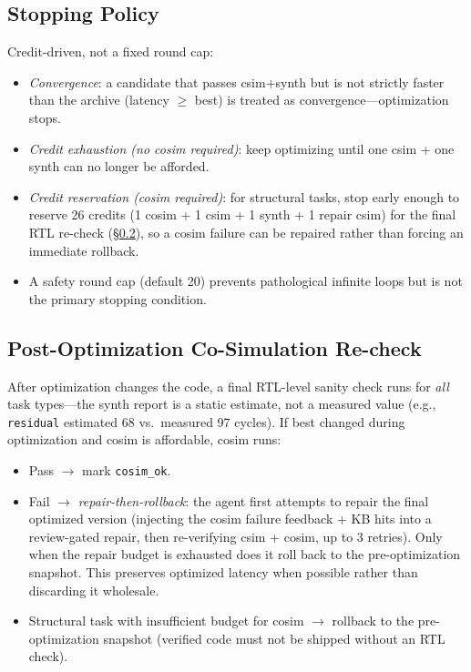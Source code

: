 \documentclass[10pt,conference,letterpaper]{IEEEtran}
\begin{document}
\subsection{Stopping Policy}

Credit-driven, not a fixed round cap:
\begin{itemize}
    \item \emph{Convergence}: a candidate that passes csim+synth but is not strictly faster than the archive (latency $\geq$ best) is treated as convergence---optimization stops.
    \item \emph{Credit exhaustion (no cosim required)}: keep optimizing until one csim + one synth can no longer be afforded.
    \item \emph{Credit reservation (cosim required)}: for structural tasks, stop early enough to reserve 26 credits (1 cosim + 1 csim + 1 synth + 1 repair csim) for the final RTL re-check (\S\ref{sec:cosim-recheck}), so a cosim failure can be repaired rather than forcing an immediate rollback.
    \item A safety round cap (default 20) prevents pathological infinite loops but is not the primary stopping condition.
\end{itemize}

\subsection{Post-Optimization Co-Simulation Re-check}
\label{sec:cosim-recheck}

After optimization changes the code, a final RTL-level sanity check runs for \emph{all} task types---the synth report is a static estimate, not a measured value (e.g., \texttt{residual} estimated 68 vs.\ measured 97 cycles). If best changed during optimization and cosim is affordable, cosim runs:
\begin{itemize}
    \item Pass $\to$ mark \texttt{cosim\_ok}.
    \item Fail $\to$ \emph{repair-then-rollback}: the agent first attempts to repair the final optimized version (injecting the cosim failure feedback + KB hits into a review-gated repair, then re-verifying csim + cosim, up to 3 retries). Only when the repair budget is exhausted does it roll back to the pre-optimization snapshot. This preserves optimized latency when possible rather than discarding it wholesale.
    \item Structural task with insufficient budget for cosim $\to$ rollback to the pre-optimization snapshot (verified code must not be shipped without an RTL check).
\end{itemize}
\end{document}
